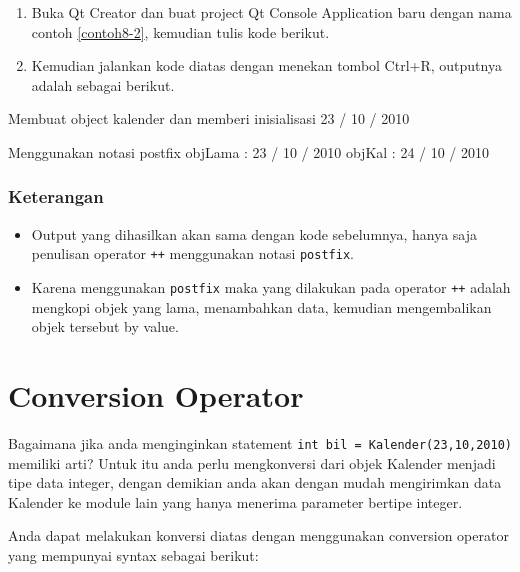 \begin{enumerate}

\item
  Buka Qt Creator dan buat project Qt Console Application baru dengan
  nama contoh \ref{contoh8-2}, kemudian tulis kode berikut.



\item
  Kemudian jalankan kode diatas dengan menekan tombol Ctrl+R, outputnya
  adalah sebagai berikut.
\end{enumerate}

\begin{lcverbatim}
Membuat object kalender dan memberi inisialisasi
23 / 10 / 2010

Menggunakan notasi postfix
objLama : 23 / 10 / 2010
objKal : 24 / 10 / 2010
\end{lcverbatim}

\subsubsection*{Keterangan}

\begin{itemize}

\item
  Output yang dihasilkan akan sama dengan kode sebelumnya, hanya saja
  penulisan operator \texttt{++} menggunakan notasi \texttt{postfix}.
\item
  Karena menggunakan \texttt{postfix} maka yang dilakukan pada operator
  \texttt{++} adalah mengkopi objek yang lama, menambahkan data,
  kemudian mengembalikan objek tersebut by value.
\end{itemize}

\section{Conversion Operator}\label{conversion-operator}

Bagaimana jika anda menginginkan statement
\texttt{int\ bil\ =\ Kalender(23,10,2010)} memiliki arti? Untuk itu anda
perlu mengkonversi dari objek Kalender menjadi tipe data integer, dengan
demikian anda akan dengan mudah mengirimkan data Kalender ke module lain
yang hanya menerima parameter bertipe integer.

Anda dapat melakukan konversi diatas dengan menggunakan conversion
operator yang mempunyai syntax sebagai berikut:

